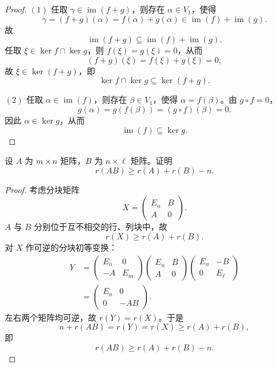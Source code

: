 \begin{proof}
	$(1)$ 任取 $\gamma\in\operatorname{im}(f+g)$，则存在 $\alpha\in V_1$，使得
	\[
	\gamma=(f+g)(\alpha)=f(\alpha)+g(\alpha)
	\in\operatorname{im}(f)+\operatorname{im}(g).
	\]
	故
	\[
	\operatorname{im}(f+g)\subseteq
	\operatorname{im}(f)+\operatorname{im}(g).
	\]
	任取 $\xi\in\ker f\cap\ker g$，则 $f(\xi)=g(\xi)=0$，从而
	\[
	(f+g)(\xi)=f(\xi)+g(\xi)=0,
	\]
	故 $\xi\in\ker(f+g)$，即
	\[
	\ker f\cap\ker g\subseteq\ker(f+g).
	\]
	
	$(2)$ 任取 $\alpha\in\operatorname{im}(f)$，则存在 $\beta\in V_1$，使得 $\alpha=f(\beta)$。由 $g\circ f=0$，
	\[
	g(\alpha)=g(f(\beta))=(g\circ f)(\beta)=0.
	\]
	因此 $\alpha\in\ker g$，从而
	\[
	\operatorname{im}(f)\subseteq\ker g.
	\]
\end{proof}

\begin{problem}
 设 $A$ 为 $m\times n$ 矩阵，$B$ 为 $n\times\ell$ 矩阵。证明
	\[
	r(AB)\geq r(A)+r(B)-n.
	\]
\end{problem}

\begin{proof}
	考虑分块矩阵
	\[
	X=\begin{pmatrix}
		E_n&B\\
		A&0
	\end{pmatrix}.
	\]
	$A$ 与 $B$ 分别位于互不相交的行、列块中，故
	\begin{equation}\tag{1}
		r(X)\geq r(A)+r(B).
	\end{equation}
	对 $X$ 作可逆的分块初等变换：
	\[
	\begin{aligned}
		Y
		&=\begin{pmatrix}
			E_n&0\\
			-A&E_m
		\end{pmatrix}
		\begin{pmatrix}
			E_n&B\\
			A&0
		\end{pmatrix}
		\begin{pmatrix}
			E_n&-B\\
			0&E_{\ell}
		\end{pmatrix}\\
		&=\begin{pmatrix}
			E_n&0\\
			0&-AB
		\end{pmatrix}.
	\end{aligned}
	\]
	左右两个矩阵均可逆，故 $r(Y)=r(X)$。于是
	\[
	n+r(AB)=r(Y)=r(X)\geq r(A)+r(B),
	\]
	即
	\[
	r(AB)\geq r(A)+r(B)-n.
	\]
\end{proof}

